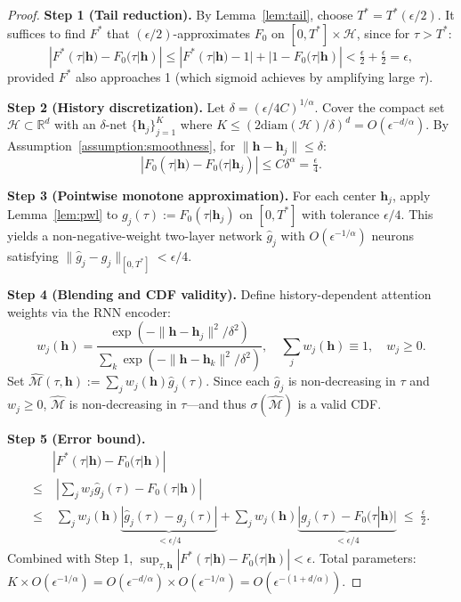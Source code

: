 \begin{proof}
\textbf{Step 1 (Tail reduction).}
By Lemma~\ref{lem:tail}, choose $T^* = T^*(\epsilon/2)$. It suffices to
find $F^*$ that $(\epsilon/2)$-approximates $F_0$ on $[0, T^*] \times \mathcal{H}$,
since for $\tau > T^*$:
\[
|F^*(\tau|\boldsymbol{h}) - F_0(\tau|\boldsymbol{h})|
\leq |F^*(\tau|\boldsymbol{h}) - 1| + |1 - F_0(\tau|\boldsymbol{h})|
< \tfrac{\epsilon}{2} + \tfrac{\epsilon}{2} = \epsilon,
\]
provided $F^*$ also approaches 1 (which sigmoid achieves by amplifying large $\tau$).

\textbf{Step 2 (History discretization).}
Let $\delta = (\epsilon/4C)^{1/\alpha}$.
Cover the compact set $\mathcal{H} \subset \mathbb{R}^d$ with an $\delta$-net
$\{\boldsymbol{h}_j\}_{j=1}^{K}$ where $K \leq (2\text{diam}(\mathcal{H})/\delta)^d
= O(\epsilon^{-d/\alpha})$.
By Assumption~\ref{assumption:smoothness}, for $\|\boldsymbol{h} - \boldsymbol{h}_j\| \leq \delta$:
\[
|F_0(\tau|\boldsymbol{h}) - F_0(\tau|\boldsymbol{h}_j)| \leq C\delta^\alpha = \tfrac{\epsilon}{4}.
\]

\textbf{Step 3 (Pointwise monotone approximation).}
For each center $\boldsymbol{h}_j$, apply Lemma~\ref{lem:pwl} to
$g_j(\tau) := F_0(\tau|\boldsymbol{h}_j)$ on $[0, T^*]$ with tolerance $\epsilon/4$.
This yields a non-negative-weight two-layer network $\hat{g}_j$ with
$O(\epsilon^{-1/\alpha})$ neurons satisfying
$\|\hat{g}_j - g_j\|_{[0,T^*]} < \epsilon/4$.

\textbf{Step 4 (Blending and CDF validity).}
Define history-dependent attention weights via the RNN encoder:
\[
w_j(\boldsymbol{h}) = \frac{\exp(-\|\boldsymbol{h}-\boldsymbol{h}_j\|^2/\delta^2)}
{\sum_{k} \exp(-\|\boldsymbol{h}-\boldsymbol{h}_k\|^2/\delta^2)},
\quad \sum_j w_j(\boldsymbol{h}) \equiv 1, \quad w_j \geq 0.
\]
Set $\hat{\mathcal{M}}(\tau, \boldsymbol{h}) := \sum_j w_j(\boldsymbol{h})\hat{g}_j(\tau)$.
Since each $\hat{g}_j$ is non-decreasing in $\tau$ and $w_j \geq 0$,
$\hat{\mathcal{M}}$ is non-decreasing in $\tau$—and thus $\sigma(\hat{\mathcal{M}})$ is a valid CDF.

\textbf{Step 5 (Error bound).}
\begin{align*}
&|F^*(\tau|\boldsymbol{h}) - F_0(\tau|\boldsymbol{h})| \\
\leq &\;\left|\sum_j w_j \hat{g}_j(\tau) - F_0(\tau|\boldsymbol{h})\right|\\
\leq &\;\sum_j w_j(\boldsymbol{h})\underbrace{|\hat{g}_j(\tau) - g_j(\tau)|}_{<\epsilon/4}
+ \sum_j w_j(\boldsymbol{h})\underbrace{|g_j(\tau) - F_0(\tau|\boldsymbol{h})|}_{<\epsilon/4}
\;\leq\; \tfrac{\epsilon}{2}.
\end{align*}
Combined with Step 1, $\sup_{\tau,\boldsymbol{h}}|F^*(\tau|\boldsymbol{h}) - F_0(\tau|\boldsymbol{h})| < \epsilon$.
Total parameters: $K \times O(\epsilon^{-1/\alpha}) = O(\epsilon^{-d/\alpha}) \times O(\epsilon^{-1/\alpha})
= O(\epsilon^{-(1+d/\alpha)})$.
\end{proof}

